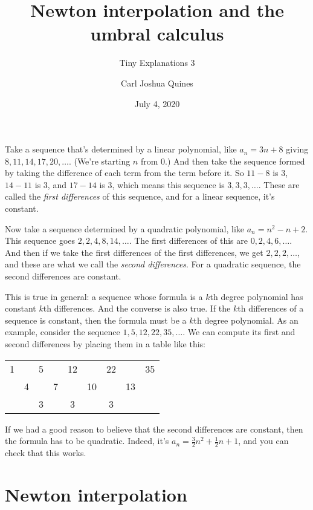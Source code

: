 \documentclass[11pt,paper=letter]{scrartcl}
\begin{document}
\title{Newton interpolation and the umbral calculus}
\subtitle{Tiny Explanations 3}
\author{Carl Joshua Quines}
\date{July 4, 2020}

\maketitle

\renewcommand{\thetitle}{Newton interpolation}

Take a sequence that's determined by a linear polynomial, like $a_n = 3n + 8$ giving $8, 11, 14, 17, 20, \ldots$. (We're starting $n$ from $0$.) And then take the sequence formed by taking the difference of each term from the term before it. So $11 - 8$ is $3$, $14 - 11$ is $3$, and $17 - 14$ is $3$, which means this sequence is $3, 3, 3, \ldots$. These are called the \textit{first differences} of this sequence, and for a linear sequence, it's constant.

Now take a sequence determined by a quadratic polynomial, like $a_n = n^2 - n + 2$. This sequence goes $2, 2, 4, 8, 14, \ldots$. The first differences of this are $0, 2, 4, 6, \ldots$. And then if we take the first differences of the first differences, we get $2, 2, 2, \ldots$, and these are what we call the \textit{second differences}. For a quadratic sequence, the second differences are constant.

This is true in general: a sequence whose formula is a $k$th degree polynomial has constant $k$th differences. And the converse is also true. If the $k$th differences of a sequence is constant, then the formula must be a $k$th degree polynomial. As an example, consider the sequence $1, 5, 12, 22, 35, \ldots$. We can compute its first and second differences by placing them in a table like this:

\begin{center}
\begin{tabular}{ccccccccc}
1 &   & 5 &   & 12 &    & 22 &    & 35 \\
  & 4 &   & 7 &    & 10 &    & 13 & \\
  &   & 3 &   & 3  &    & 3  &    &
\end{tabular}
\end{center}

If we had a good reason to believe that the second differences are constant, then the formula has to be quadratic. Indeed, it's $a_n = \frac{3}{2}n^2 + \frac{1}{2}n + 1$, and you can check that this works.

\section{Newton interpolation}
\end{document}
